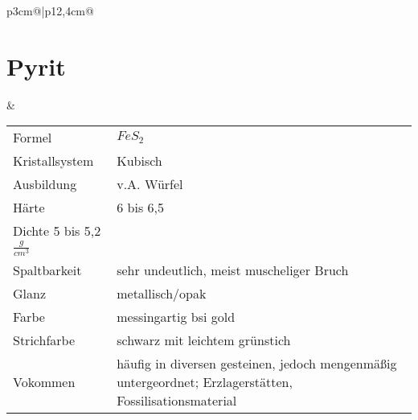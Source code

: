 \documentclass[a4, 12pt]{scrreprt}
\begin{document}
\begin{tabular}{p{3cm}@{}|p{}@{}}
\section{Pyrit} & 
\begin{tabular}{p{3cm}@{}p{9cm}@{}}
Formel & $FeS_2$\\
Kristallsystem & Kubisch\\
Ausbildung & v.A. Würfel\\
Härte & 6 bis 6,5\\
Dichte 5 bis 5,2 $\frac{g}{cm^3}$\\
Spaltbarkeit & sehr undeutlich, meist muscheliger Bruch\\
Glanz & metallisch/opak\\
Farbe & messingartig bsi gold\\
Strichfarbe & schwarz mit leichtem grünstich\\
Vokommen & häufig in diversen gesteinen, jedoch mengenmäßig untergeordnet; Erzlagerstätten, Fossilisationsmaterial\\
\end{tabular}\\
\hline
\end{tabular}
\end{document}
